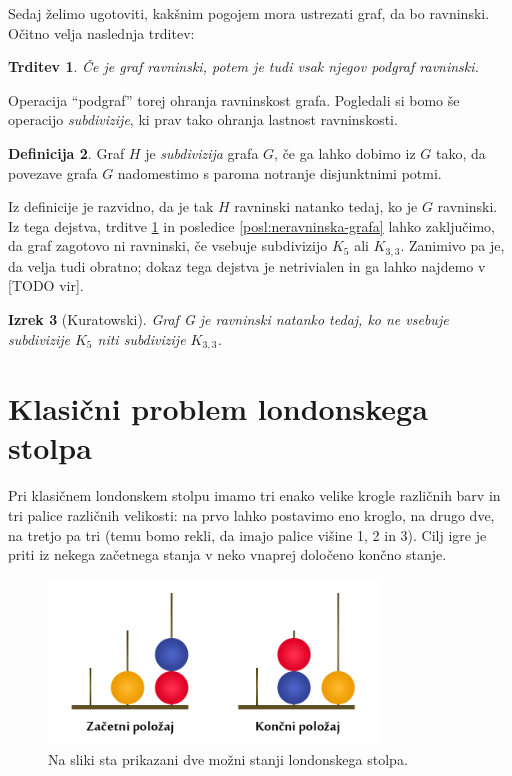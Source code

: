 \documentclass[12pt,a4paper]{amsart}
\theoremstyle{definition} %
\newtheorem{definicija}{Definicija}[section]
\theoremstyle{plain} %
\newtheorem{izrek}[definicija]{Izrek}
\newtheorem{trditev}[definicija]{Trditev}
\newcommand{\N}{\mathbb N}
\newcommand{\graf}[1][G]{\ensuremath{#1 = (V(#1), E(#1))}}
\newcommand{\vozlisca}[1][G]{\ensuremath{V(#1)}}
\newcommand{\povezave}[1][G]{\ensuremath{E(#1)}}
\begin{document}
Sedaj želimo ugotoviti, kakšnim pogojem mora ustrezati graf, da bo ravninski. Očitno velja naslednja trditev:

\begin{trditev}
    \label{trd:podgraf}
    Če je graf ravninski, potem je tudi vsak njegov podgraf ravninski. %
\end{trditev}

Operacija ``podgraf'' torej ohranja ravninskost grafa.
Pogledali si bomo še operacijo \emph{subdivizije}, ki prav tako ohranja lastnost ravninskosti.

\begin{definicija}
    Graf $H$ je \emph{subdivizija} grafa $G$, če ga lahko dobimo iz $G$ tako, da povezave grafa $G$ nadomestimo s paroma notranje disjunktnimi potmi.
\end{definicija}

Iz definicije je razvidno, da je tak $H$ ravninski natanko tedaj, ko je $G$ ravninski. Iz tega dejstva, trditve \ref{trd:podgraf} in posledice \ref{posl:neravninska-grafa} lahko zaključimo, da graf zagotovo ni ravninski, če vsebuje subdivizijo $K_5$ ali $K_{3,3}$. Zanimivo pa je, da velja tudi obratno; dokaz tega dejstva je netrivialen in ga lahko najdemo v [TODO vir].

\begin{izrek}[Kuratowski]
    Graf G je ravninski natanko tedaj, ko ne vsebuje subdivizije $K_5$ niti subdivizije $K_{3,3}$.
\end{izrek}

\section{Klasični problem londonskega stolpa}
Pri klasičnem londonskem stolpu imamo tri enako velike krogle različnih barv in tri palice različnih velikosti: na prvo lahko postavimo eno kroglo, na drugo dve, na tretjo pa tri (temu bomo rekli, da imajo palice višine 1, 2 in 3). Cilj igre je priti iz nekega začetnega stanja v neko vnaprej določeno končno stanje.

\begin{figure}[h]
    \includegraphics[width=250pt]{img/london-tower.png}
    \caption{Na sliki sta prikazani dve možni stanji londonskega stolpa.}
    \label{fig:stanji}
\end{figure}
\end{document}
